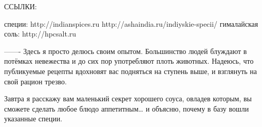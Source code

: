ССЫЛКИ:

специи:
http://indianspices.ru 
http://ashaindia.ru/indiyskie-specii/
гималайская соль:
http://hpcsalt.ru

-------
Здесь я просто делюсь своим опытом. Большинство людей блуждают в потёмках невежества и до сих пор употребляют плоть животных. Надеюсь, что публикуемые рецепты вдохновят вас подняться на ступень выше, и взглянуть на свой рацион трезво.

Завтра я расскажу вам маленький секрет хорошего соуса, овладев которым, вы сможете сделать любое блюдо аппетитным… и объясню, почему в базу вошли указанные специи.

